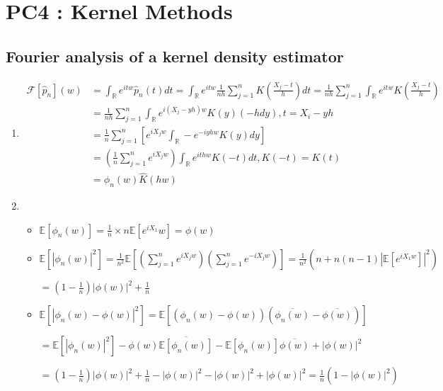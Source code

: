 \documentclass[10pt,a4paper,oneside]{article}
\begin{document}
\newpage
\section{PC4 : Kernel Methods}

\subsection{Fourier analysis of a kernel density estimator}

\begin{enumerate}
\item
\begin{align*}
\mathcal{F}[\hat{p}_n](w) &= \int_\mathbb{R} e^{itw} \hat{p}_n(t) dt =  \int_\mathbb{R} e^{itw} \frac{1}{nh} \sum_{j = 1}^n K(\frac{X_j - t}{h}) dt = \frac{1}{nh} \sum_{j = 1}^n \int_\mathbb{R} e^{itw} K(\frac{X_j - t}{h}) \\
&= \frac{1}{nh	} \sum_{j = 1}^n \int_\mathbb{R} e^{i(X_j - yh)w} K(y) (-hdy), t  = X_i - yh \\
&= \frac{1}{n} \sum_{j = 1}^n \left[ e^{iX_j w} \int_\mathbb{R} -e^{-iyhw} K(y) dy\right] \\
&= \left( \frac{1}{n} \sum_{j = 1}^n e^{iX_j w} \right) \int_\mathbb{R} e^{ithw} K(-t)dt, K(-t) = K(t) \\ 
&= \phi_n(w) \hat{K}(hw)
\end{align*}

\item
\begin{itemize}
\item
$\mathbb{E}[\phi_n(w)] = \frac{1}{n} \times n \mathbb{E}[e^{iX_1}w] = \phi(w)$
\item
$\mathbb{E}[|\phi_n(w)|^2] = \frac{1}{n^2} \mathbb{E}[(\sum_{j = 1}^n e^{iX_jw})(\sum_{j = 1}^n e^{-iX_jw})] = \frac{1}{n^2}(n + n(n - 1) |\mathbb{E}[e^{iX_1w}]|^2)$

$=  (1 - \frac{1}{n})|\phi(w)|^2 + \frac{1}{n}$
\item
$\mathbb{E}[|\phi_n(w) - \phi(w)|^2] = \mathbb{E}[(\phi_n(w) - \phi(w))(\overline{\phi_n(w)} - \overline{\phi(w)})]$

$= \mathbb{E}[|\phi_n(w)|^2] - \phi(w) \overline{\mathbb{E}[\phi_n(w)]} - \mathbb{E}[\phi_n(w)] \overline{\phi(w)} + |\phi(w)|^2$

$= (1 - \frac{1}{n})|\phi(w)|^2 + \frac{1}{n} - |\phi(w)|^2 - |\phi(w)|^2 + |\phi(w)|^2 = \frac{1}{n}(1 - |\phi(w)|^2)$
\end{itemize}


\end{enumerate}
\end{document}
